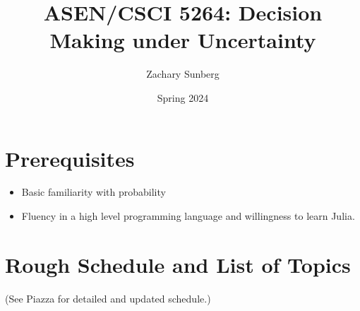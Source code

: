 \documentclass[9pt]{article}
\title{ASEN/CSCI 5264: Decision Making under Uncertainty}
\author{Zachary Sunberg}
\date{Spring 2024}
\begin{document}
\maketitle

\section*{Prerequisites}

\begin{itemize}[nosep]
    \item Basic familiarity with probability
    \item Fluency in a high level programming language and willingness to learn Julia.
\end{itemize}

\section*{Rough Schedule and List of Topics}

(See Piazza for detailed and updated schedule.)
\end{document}
